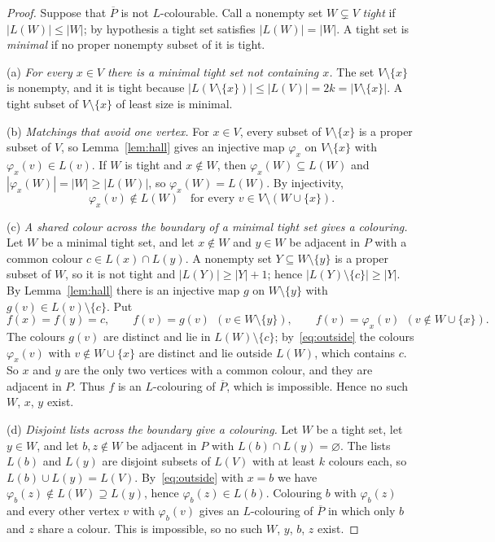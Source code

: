 \documentclass[11pt,a4paper,reqno]{amsart}
\theoremstyle{definition}
\theoremstyle{remark}
\begin{document}
\begin{proof}
Suppose that $\overline P$ is not $L$-colourable. Call a nonempty set $W\subsetneq V$ \emph{tight} if $|L(W)|\le|W|$; by hypothesis a tight set satisfies $|L(W)|=|W|$. A tight set is \emph{minimal} if no proper nonempty subset of it is tight.

\smallskip\noindent(a) \emph{For every $x\in V$ there is a minimal tight set not containing $x$.} The set $V\setminus\{x\}$ is nonempty, and it is tight because $|L(V\setminus\{x\})|\le|L(V)|=2k=|V\setminus\{x\}|$. A tight subset of $V\setminus\{x\}$ of least size is minimal.

\smallskip\noindent(b) \emph{Matchings that avoid one vertex.} For $x\in V$, every subset of $V\setminus\{x\}$ is a proper subset of $V$, so Lemma~\ref{lem:hall} gives an injective map $\varphi_x$ on $V\setminus\{x\}$ with $\varphi_x(v)\in L(v)$. If $W$ is tight and $x\notin W$, then $\varphi_x(W)\subseteq L(W)$ and $|\varphi_x(W)|=|W|\ge|L(W)|$, so $\varphi_x(W)=L(W)$. By injectivity,
\begin{equation}\label{eq:outside}
\varphi_x(v)\notin L(W)\quad\text{for every }v\in V\setminus(W\cup\{x\}).
\end{equation}

\smallskip\noindent(c) \emph{A shared colour across the boundary of a minimal tight set gives a colouring.} Let $W$ be a minimal tight set, and let $x\notin W$ and $y\in W$ be adjacent in $P$ with a common colour $c\in L(x)\cap L(y)$. A nonempty set $Y\subseteq W\setminus\{y\}$ is a proper subset of $W$, so it is not tight and $|L(Y)|\ge|Y|+1$; hence $|L(Y)\setminus\{c\}|\ge|Y|$. By Lemma~\ref{lem:hall} there is an injective map $g$ on $W\setminus\{y\}$ with $g(v)\in L(v)\setminus\{c\}$. Put
\[
f(x)=f(y)=c,\qquad f(v)=g(v)\ \ (v\in W\setminus\{y\}),\qquad f(v)=\varphi_x(v)\ \ (v\notin W\cup\{x\}).
\]
The colours $g(v)$ are distinct and lie in $L(W)\setminus\{c\}$; by~\eqref{eq:outside} the colours $\varphi_x(v)$ with $v\notin W\cup\{x\}$ are distinct and lie outside $L(W)$, which contains $c$. So $x$ and $y$ are the only two vertices with a common colour, and they are adjacent in $P$. Thus $f$ is an $L$-colouring of $\overline P$, which is impossible. Hence no such $W$, $x$, $y$ exist.

\smallskip\noindent(d) \emph{Disjoint lists across the boundary give a colouring.} Let $W$ be a tight set, let $y\in W$, and let $b,z\notin W$ be adjacent in $P$ with $L(b)\cap L(y)=\varnothing$. The lists $L(b)$ and $L(y)$ are disjoint subsets of $L(V)$ with at least $k$ colours each, so $L(b)\cup L(y)=L(V)$. By~\eqref{eq:outside} with $x=b$ we have $\varphi_b(z)\notin L(W)\supseteq L(y)$, hence $\varphi_b(z)\in L(b)$. Colouring $b$ with $\varphi_b(z)$ and every other vertex $v$ with $\varphi_b(v)$ gives an $L$-colouring of $\overline P$ in which only $b$ and $z$ share a colour. This is impossible, so no such $W$, $y$, $b$, $z$ exist.


\end{proof}
\end{document}
